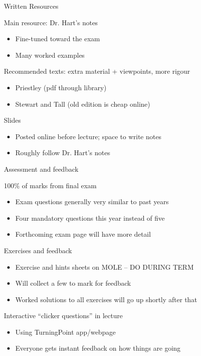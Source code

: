\documentclass{beamer}
\begin{document}
\begin{frame}{Written Resources}
\begin{block}{Main resource: Dr. Hart's notes}
\begin{itemize}
\item  Fine-tuned toward the exam
\item Many worked examples
\end{itemize}
\end{block}

\begin{block}{Recommended texts: extra material + viewpoints, more rigour}
\begin{itemize}
\item Priestley (pdf through library)
\item Stewart and Tall (old edition is cheap online)
\end{itemize}
\end{block}

\begin{block}{Slides}
\begin{itemize}
\item Posted online before lecture; space to write notes
\item Roughly follow Dr. Hart's notes
\end{itemize}
\end{block}
\end{frame}

\begin{frame}{Assessment and feedback}
  \begin{block}{100\% of marks from final exam}
\begin{itemize}
\item Exam questions generally very similar to past years
\item \alert{Four mandatory questions this year instead of five}
  \item Forthcoming exam page will have more detail
\end{itemize}
  \end{block}
  \begin{block}{Exercises and feedback}
    \begin{itemize}
    \item Exercise and hints sheets on MOLE -- \alert{DO DURING TERM}
    \item Will collect a few to mark for feedback
    \item Worked solutions to all exercises will go up shortly after that
            \end{itemize}
  \end{block}
  \begin{block}{Interactive ``clicker questions'' in lecture}
\begin{itemize}
\item    Using TurningPoint app/webpage 
\item Everyone gets instant feedback on how things are going
\end{itemize}
\end{block}
\end{frame}
\end{document}
